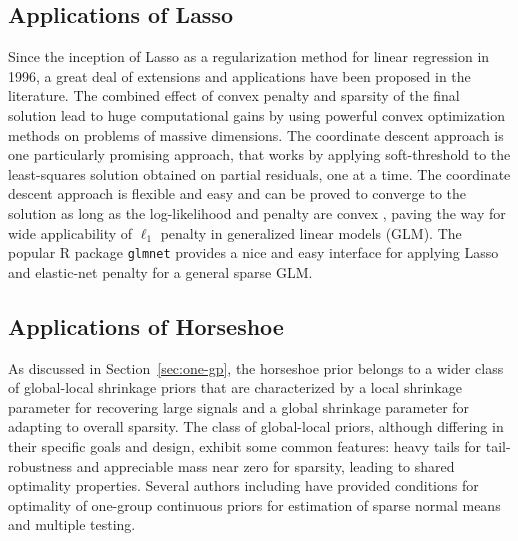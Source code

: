 \documentclass[sts,preprint]{imsart}
\begin{document}
\subsection{Applications of Lasso} Since the inception of Lasso as a regularization method for linear regression in 1996, a great deal of extensions and applications have been proposed in the literature. The combined effect of convex penalty and sparsity of the final solution lead to huge computational gains by using powerful convex optimization methods on problems of massive dimensions. The coordinate descent approach \citep{friedman_pathwise_2007, friedman2010regularization} is one particularly promising approach, that works by applying soft-threshold to the least-squares solution obtained on partial residuals, one at a time. The coordinate descent approach is flexible and easy and can be proved to converge to the solution as long as the log-likelihood and penalty are convex \citep{tseng2001convergence}, paving the way for wide applicability of $\ell_1$ penalty in generalized linear models (GLM). The popular R package \texttt{glmnet} provides a nice and easy interface for applying Lasso and elastic-net penalty for a general sparse GLM.


\subsection{Applications of Horseshoe}

As discussed in Section~\ref{sec:one-gp}, the horseshoe prior belongs to a wider class of global-local shrinkage priors \citep{polson2010shrink} that are characterized by a local shrinkage parameter for recovering large signals and a global shrinkage parameter for adapting to overall sparsity. The class of global-local priors, although differing in their specific goals and design, exhibit some common features: heavy tails for tail-robustness and appreciable mass near zero for sparsity, leading to shared optimality properties. Several authors including \citet{van2015conditions, ghosh2016asymptotic, ghosh2016testing} have provided conditions for optimality of one-group continuous priors for estimation of sparse normal means and multiple testing. 
\end{document}
